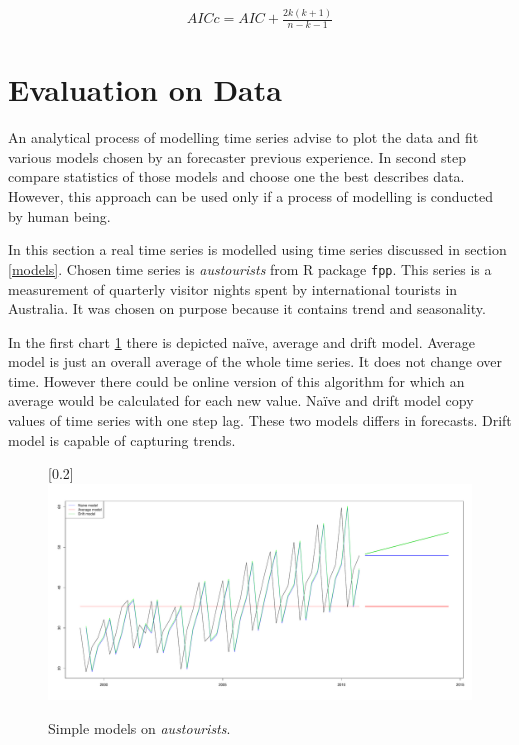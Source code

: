     \begin{eqnarray} \label{aicc}
        AICc = AIC + \frac{2k(k+1)}{n-k-1}
    \end{eqnarray}

    \section{Evaluation on Data}
    An analytical process of modelling time series advise to plot the data and fit various models chosen by an
    forecaster previous experience. In second step compare statistics of those models and choose one the best describes
    data. However, this approach can be used only if a process of modelling is conducted by human being.

    In this section a real time series is modelled using time series discussed in section \ref{models}.
    Chosen time series is \emph{austourists} from R package \texttt{fpp}. This series is a measurement of quarterly
    visitor nights spent by international tourists in Australia. It was chosen on purpose because it
    contains trend and seasonality.

    In the first chart \ref{img:simple-models} there is depicted na\"{i}ve, average and drift model. Average model is
    just an overall average of the whole time series. It does not change over time. However there could be online
    version of this algorithm for which an average would be calculated for each new value. Na\"{i}ve and drift model
    copy values of time series with one step lag. These two models differs in forecasts. Drift model is capable of
    capturing trends.

    \begin{figure}[H]
        \begin{center}
            \scalebox{0.25}[0.2]{\includegraphics{img/simple-models.pdf}}
            \caption{Simple models on \emph{austourists}.}
            \label{img:simple-models}
        \end{center}
    \end{figure}

